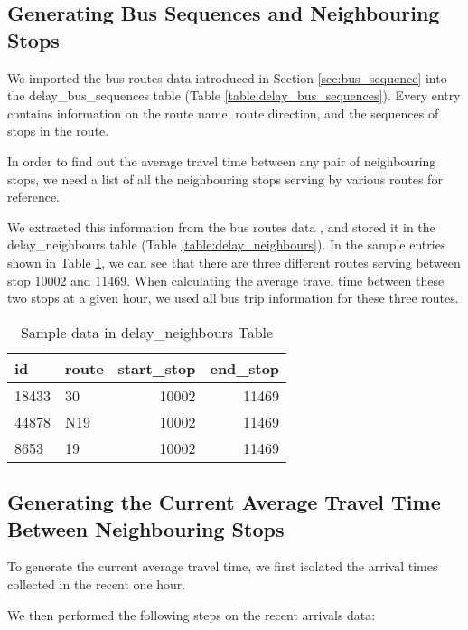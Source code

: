 \subsection{Generating Bus Sequences and Neighbouring Stops}
\label{sec:bus_stop_locations_routes}
\par We imported the bus routes data introduced in Section \ref{sec:bus_sequence} into the delay\_bus\_sequences table (Table \ref{table:delay_bus_sequences}). Every entry contains information on the route name, route direction, and the sequences of stops in the route.

\par In order to find out the average travel time between any pair of neighbouring stops, we need a list of all the neighbouring stops serving by various routes for reference.

\par We extracted this information from the bus routes data , and stored it in the delay\_neighbours table (Table \ref{table:delay_neighbours}). In the sample entries shown in Table \ref{table:sample_neighbours_view}, we can see that there are three different routes serving between stop 10002 and 11469. When calculating the average travel time between these two stops at a given hour, we used all bus trip information for these three routes.

\begin{table}
\centering
\begin{tabular}{@{}llrr@{}} \toprule
id & route & start\_stop & end\_stop \\ \midrule
18433 & 30 & 10002 & 11469 \\
44878 & N19 & 10002 & 11469 \\
8653 & 19 & 10002 & 11469 \\ \bottomrule
\end{tabular}
\caption{Sample data in delay\_neighbours Table}
\label{table:sample_neighbours_view}
\end{table}

\subsection{Generating the Current Average Travel Time Between Neighbouring Stops}
\par To generate the current average travel time, we first isolated the arrival times collected in the recent one hour.

\par We then performed the following steps on the recent arrivals data:

